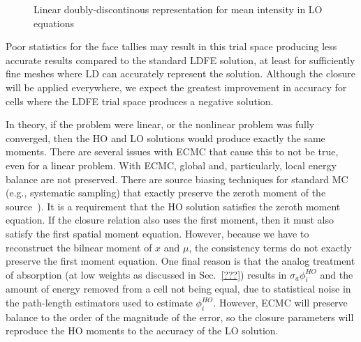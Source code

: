 \begin{figure}[H]
    \centering
    \begin{center}
    \end{center}
    \caption{Linear doubly-discontinous representation for mean intensity in LO equations}
    \label{fig:ldd_space}
\end{figure}


    Poor statistics for the face tallies may result in this trial space producing less
accurate results compared to the standard LDFE solution, at least for sufficiently fine meshes where LD
can accurately represent the solution.  Although the closure will be applied everywhere,
we expect the greatest improvement in accuracy for cells where the LDFE trial space
produces a negative solution.

In theory, if the problem were linear, or the nonlinear problem was fully converged,
then the HO and LO solutions would produce exactly the same moments.  There are
several issues with ECMC that cause this to not be true, even for a linear problem.
With ECMC, global and, particularly, local energy balance are not preserved.  There
are source biasing techniques for standard MC (e.g., systematic
sampling) that exactly preserve the zeroth moment of the source~\cite{shultis_mc}). 
It is a requirement that the HO solution satisfies the zeroth moment equation. If the
closure relation also uses the first moment, then it must also satisfy the first
spatial moment equation.  However, because we have to reconstruct the bilnear moment
of $x$ and $\mu$, the consistency terms do not exactly preserve the first moment
equation.  One final reason is that the analog treatment of absorption (at low
weights as discussed in Sec.~\ref{???}) results in $\sigma_a \phi^{HO}_i$ and the amount
of energy removed from a cell not being equal, due to statistical noise in the
path-length estimators used to estimate $\phi^{HO}_i$.  However, ECMC will preserve
balance to the order of the magnitude of the error, so the closure parameters will
reproduce the HO moments to the accuracy of the LO solution.

